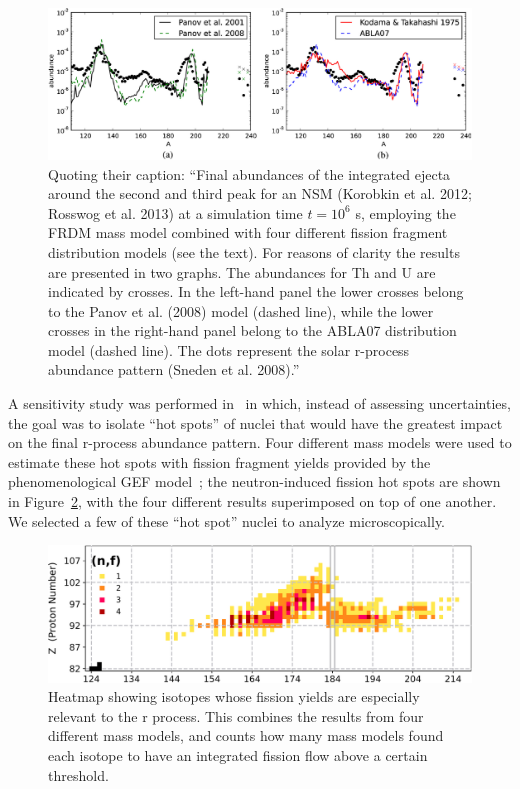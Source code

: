 \begin{figure}
	\centering
	\includegraphics[width=0.9\linewidth]{TeX_files/rProc_abundances}
	\caption[Final r-process abundances for a neutron star merger scenario with different fission fragment distributions.]{Quoting their caption: ``Final abundances of the integrated ejecta around the second and third peak for an NSM (Korobkin et al. 2012; Rosswog et al. 2013) at a simulation time $t={10}^{6}$ s, employing the FRDM mass model combined with four different fission fragment distribution models (see the text). For reasons of clarity the results are presented in two graphs. The abundances for Th and U are indicated by crosses. In the left-hand panel the lower crosses belong to the Panov et al. (2008) model (dashed line), while the lower crosses in the right-hand panel belong to the ABLA07 distribution model (dashed line). The dots represent the solar r-process abundance pattern (Sneden et al. 2008).''~\cite{Eichler2015}}
	\label{fig:rprocabundances}
\end{figure}

A sensitivity study was performed in~\cite{Vassh2018} in which, instead of assessing uncertainties, the goal was to isolate ``hot spots'' of nuclei that would have the greatest impact on the final r-process abundance pattern. Four different mass models were used to estimate these hot spots with fission fragment yields provided by the phenomenological GEF model~\cite{Schmidt2016}; the neutron-induced fission hot spots are shown in Figure~\ref{fig:rprocimportant-fissions}, with the four different results superimposed on top of one another. We selected a few of these ``hot spot'' nuclei to analyze microscopically.

\begin{figure}
	\centering
	\includegraphics[width=0.7\linewidth]{TeX_files/rProc_important-fissions}
	\caption[Isotopes whose fission yields are especially relevant to the r process]{Heatmap showing isotopes whose fission yields are especially relevant to the r process. This combines the results from four different mass models, and counts how many mass models found each isotope to have an integrated fission flow above a certain threshold.~\cite{Vassh2018}}
	\label{fig:rprocimportant-fissions}
\end{figure}

